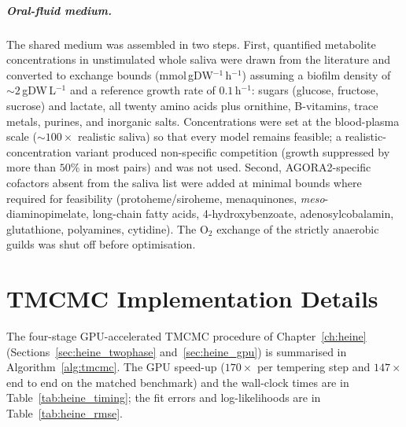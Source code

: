 \paragraph{Oral-fluid medium.}
The shared medium was assembled in two steps. First, quantified metabolite
concentrations in unstimulated whole saliva were drawn from the literature and
converted to exchange bounds (mmol\,gDW$^{-1}$\,h$^{-1}$) assuming a biofilm density
of ${\sim}2$\,gDW\,L$^{-1}$ and a reference growth rate of $0.1$\,h$^{-1}$:
sugars (glucose, fructose, sucrose) and lactate, all twenty amino acids plus
ornithine, B-vitamins, trace metals, purines, and inorganic salts.
Concentrations were set at the blood-plasma scale (${\sim}100\times$ realistic
saliva) so that every model remains feasible; a realistic-concentration variant
produced non-specific competition (growth suppressed by more than $50\%$ in most pairs) and
was not used. Second, AGORA2-specific cofactors absent from the saliva list were
added at minimal bounds where required for feasibility (protoheme/siroheme,
menaquinones, \textit{meso}-diaminopimelate, long-chain fatty acids,
4-hydroxybenzoate, adenosylcobalamin, glutathione, polyamines, cytidine). The O$_2$
exchange of the strictly anaerobic guilds was shut off before optimisation.

\chapter{TMCMC Implementation Details}
\label{app:tmcmc}

The four-stage GPU-accelerated TMCMC procedure of Chapter~\ref{ch:heine}
(Sections~\ref{sec:heine_twophase} and~\ref{sec:heine_gpu}) is summarised in
Algorithm~\ref{alg:tmcmc}. The GPU speed-up ($170\times$ per tempering step and
$147\times$ end to end on the matched benchmark) and the wall-clock times are in
Table~\ref{tab:heine_timing}; the fit errors and log-likelihoods are in
Table~\ref{tab:heine_rmse}.

